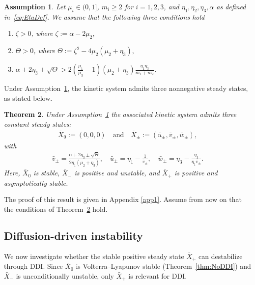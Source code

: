 \documentclass[12pt, a4paper]{amsart}
\numberwithin{equation}{section}
\newcommand{\CSS}{\bar{X}}
\newtheorem{theorem}{\bf Theorem}[section]
\newtheorem{assumption}[theorem]{\bf Assumption}
\begin{document}
\begin{assumption}\label{assump:Parameters}
Let $\mu_i \in (0,1]$, $m_i\ge2$ for $i=1,2,3$, and $\eta_1, \eta_2, \eta_3, \alpha$ as defined in~\eqref{eq:EtaDef}. We assume that the following three conditions hold
\begin{enumerate}
    \item\label{item:first_assumption} $\zeta > 0$, where $\zeta := \alpha - 2\mu_2,$
    \item\label{item:sec_assumption} $\Theta > 0$, where $\Theta := \zeta^2 - 4 \mu_2 (\mu_2 + \eta_3),$
    \item\label{item:third_assumption} $\alpha + 2\eta_3 + \sqrt{\Theta} > 2\left(\frac{\mu_1}{\mu_3} - 1\right)(\mu_2 + \eta_3)\frac{\eta_1 \eta_3}{m_1 + m_2}.$
\end{enumerate}
\end{assumption}

Under Assumption~\ref{assump:Parameters}, the kinetic system admits three nonnegative steady states, as stated below.

\begin{theorem}\label{thm:bistabletoysys}
Under Assumption~\ref{assump:Parameters} the associated kinetic system admits three constant steady states:
\begin{align}
\CSS_{0} := (0, 0, 0)
\quad\text{and}\quad
\CSS_\pm := (\bar u_\pm, \bar v_\pm, \bar w_\pm),
\end{align}
with
\begin{align}
\label{eq:steadystates}
\bar v_\pm= \frac{\alpha + 2\eta_3 \pm \sqrt{\Theta}}{2 \eta_1 (\mu_2 + \eta_3)},\quad
\bar u_\pm = \eta_1 - \frac{1}{\bar v_\pm},\quad
\bar w_\pm = \eta_3 - \frac{\eta_3}{\eta_1 \bar v_\pm}.
\end{align}
Here, $\CSS_{0}$ is stable, $\CSS_-$ is positive and unstable, and $\CSS_+$ is positive and asymptotically stable.
\end{theorem}

The proof of this result is given in Appendix \ref{app1}.
Assume from now on that the conditions of Theorem~\ref{thm:bistabletoysys} hold. 

\subsection{Diffusion-driven instability}
We now investigate whether the stable positive steady state $\CSS_+$ can destabilize through DDI.
Since $\CSS_{0}$ is Volterra--Lyapunov stable (Theorem~\ref{thm:NoDDI}) and $\CSS_-$ is unconditionally unstable, only $\CSS_+$ is relevant for DDI.
\end{document}
